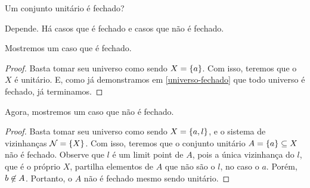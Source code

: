 \begin{question}
	Um conjunto unitário é fechado?
\end{question}

\begin{answer}
	Depende. Há casos que é fechado e casos que não é fechado.
	
	Mostremos um caso que é fechado.
	\begin{proof}	
		Basta tomar seu universo como sendo $X = \left\{a\right\}$. Com isso, teremos que o $X$ é unitário. E, como já demonstramos em \ref{universo-fechado} que todo universo é fechado, já terminamos. 
	\end{proof}

	Agora, mostremos um caso que não é fechado.
	\begin{proof}
		Basta tomar seu universo como sendo $X = \left\{a,l\right\}$, e o sistema de vizinhanças $\mathcal{N} = \left\{X\right\}$. Com isso, teremos que o conjunto unitário $A = \left\{a\right\} \subseteq X$ não é fechado. Observe que $l$ é um limit point de $A$, pois a única vizinhança do $l$, que é o próprio $X$, partilha elementos de $A$ que não são o $l$, no caso o $a$. Porém, $b \not\in A$. Portanto, o $A$ não é fechado mesmo sendo unitário.
	\end{proof}
\end{answer}